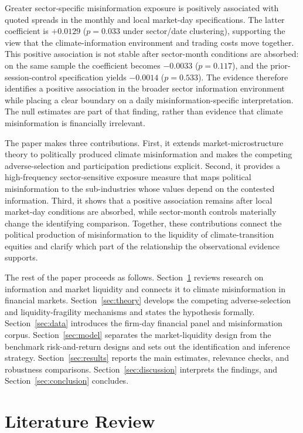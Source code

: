 \documentclass{article}
\theoremstyle{plain}
\begin{document}
Greater sector-specific misinformation exposure is positively associated with quoted spreads in the monthly and local market-day specifications. The latter coefficient is $+0.0129$ ($p=0.033$ under sector/date clustering), supporting the view that the climate-information environment and trading costs move together. This positive association is not stable after sector-month conditions are absorbed: on the same sample the coefficient becomes $-0.0033$ ($p=0.117$), and the prior-session-control specification yields $-0.0014$ ($p=0.533$). The evidence therefore identifies a positive association in the broader sector information environment while placing a clear boundary on a daily misinformation-specific interpretation. The null estimates are part of that finding, rather than evidence that climate misinformation is financially irrelevant.

The paper makes three contributions. First, it extends market-microstructure theory to politically produced climate misinformation and makes the competing adverse-selection and participation predictions explicit. Second, it provides a high-frequency sector-sensitive exposure measure that maps political misinformation to the sub-industries whose values depend on the contested information. Third, it shows that a positive association remains after local market-day conditions are absorbed, while sector-month controls materially change the identifying comparison. Together, these contributions connect the political production of misinformation to the liquidity of climate-transition equities and clarify which part of the relationship the observational evidence supports.

The rest of the paper proceeds as follows. Section~\ref{sec:lit_review} reviews research on information and market liquidity and connects it to climate misinformation in financial markets. Section~\ref{sec:theory} develops the competing adverse-selection and liquidity-fragility mechanisms and states the hypothesis formally. Section~\ref{sec:data} introduces the firm-day financial panel and misinformation corpus. Section~\ref{sec:model} separates the market-liquidity design from the benchmark risk-and-return designs and sets out the identification and inference strategy. Section~\ref{sec:results} reports the main estimates, relevance checks, and robustness comparisons. Section~\ref{sec:discussion} interprets the findings, and Section~\ref{sec:conclusion} concludes.

\section{Literature Review}
\label{sec:lit_review}
\end{document}
